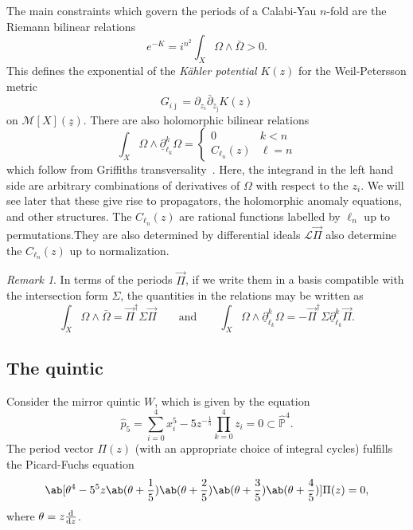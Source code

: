 \documentclass[10pt]{amsart}
\theoremstyle{definition}
\theoremstyle{remark}
\newtheorem{rmk}[thm]{Remark}
\theoremstyle{plain}
\theoremstyle{definition}
\theoremstyle{remark}
\renewcommand{\P}{\mathbb{P}}
\newcommand{\mc}[1]{\mathcal{#1}}
\newcommand{\uz}{\ul{z}}
\newcommand{\ul}[1]{\underline{#1}}
\newcommand{\1}{\mathbf{1}}
\newcommand{\2}{\mathbf{2}}
\newcommand{\3}{\mathbf{3}}
\begin{document}
The main constraints which govern the periods of a Calabi-Yau $n$-fold are the Riemann bilinear relations
\[ e^{-K} = i^{n^2} \int_X \Omega \wedge \bar{\Omega} > 0. \]
This defines the exponential of the \textit{K\"ahler potential} $K(z)$ for the Weil-Petersson metric
\[ G_{i\bar{\jmath}} = \partial_{z_i} \bar{\partial}_{\bar{z}_{\bar{\jmath}}} K(z) \]
on $\mc{M}[X](\uz)$. There are also holomorphic bilinear relations
\[ \int_X \Omega \wedge \ul{\partial}_{\ell_k}^k \Omega = \begin{cases}
    0 & k < n \\
    C_{\ell_n}(z) & \ell = n
\end{cases}
\]
which follow from Griffiths transversality~\cite{periods1,periods2}. Here, the integrand in the left hand side are arbitrary combinations of derivatives of $\Omega$ with respect to the $z_i$. We will see later that these give rise to propagators, the holomorphic anomaly equations, and other structures. The $C_{\ell_n}(z)$ are rational functions labelled by $\ell_n$ up to permutations.They are also determined by differential ideals $\mc{L}\vec{\Pi}$ also determine the $C_{\ell_n}(z)$ up to normalization.

\begin{rmk}
    In terms of the periods $\vec{\Pi}$, if we write them in a basis compatible with the intersection form $\Sigma$, the quantities in the relations may be written as
    \[ \int_X \Omega \wedge \bar{\Omega} = \vec{\Pi}^{\dag} \Sigma \vec{\Pi} \qquad \text{and} \qquad \int_X \Omega \wedge \ul{\partial}_{\ell_k}^k \Omega = - \vec{\Pi}^{\dag}\Sigma \ul{\partial}_{\ell_k}^k \vec{\Pi}. \]
\end{rmk}

\subsection{The quintic}%
\label{sub:The quintic}

Consider the mirror quintic $W$, which is given by the equation
\[ \hat{p}_5 = \sum_{i=0}^4 x_i^5 - 5 z^{-\frac{1}{5}} \prod_{k=0}^4 z_i = 0 \subset \hat{\P}^4. \]
The period vector $\Pi(z)$ (with an appropriate choice of integral cycles) fulfills the Picard-Fuchs equation
\[ \ab[\theta^4 - 5^5z \ab(\theta + \frac{1}{5})\ab(\theta + \frac{2}{5})\ab(\theta + \frac{3}{5})\ab(\theta + \frac{4}{5})] \Pi(z) = 0, \]
where $\theta = z \odv{}{z}$.
\end{document}
